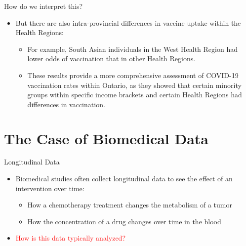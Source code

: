 \documentclass[
  ignorenonframetext,
]{beamer}
\providecommand{\tightlist}{%
  \setlength{\itemsep}{0pt}\setlength{\parskip}{0pt}}\usepackage{longtable,booktabs,array}
\begin{document}
\begin{frame}{How do we interpret this?}
\protect\hypertarget{how-do-we-interpret-this-1}{}
\begin{itemize}[<+->]
\item
  But there are also intra-provincial differences in vaccine uptake
  within the Health Regions:

  \begin{itemize}[<+->]
  \item
    For example, South Asian individuals in the West Health Region had
    lower odds of vaccination that in other Health Regions.
  \item
    These results provide a more comprehensive assessment of COVID-19
    vaccination rates within Ontario, as they showed that certain
    minority groups within specific income brackets and certain Health
    Regions had differences in vaccination.
  \end{itemize}
\end{itemize}
\end{frame}

\hypertarget{the-case-of-biomedical-data}{%
\section{The Case of Biomedical
Data}\label{the-case-of-biomedical-data}}

\begin{frame}{Longitudinal Data}
\protect\hypertarget{longitudinal-data}{}
\begin{itemize}[<+->]
\tightlist
\item
  Biomedical studies often collect longitudinal data to see the effect
  of an intervention over time:

  \begin{itemize}[<+->]
  \tightlist
  \item
    How a chemotherapy treatment changes the metabolism of a tumor
  \item
    How the concentration of a drug changes over time in the blood
  \end{itemize}
\item
  \textcolor{red}{How is this data typically analyzed?}
\end{itemize}
\end{frame}
\end{document}
